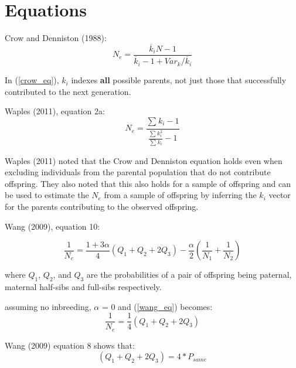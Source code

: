 \documentclass{article}
\begin{document}
\section*{Equations}
\begin{description}

\item Crow and Denniston (1988):
\begin{equation} \label{crow_eq}
N_e = \dfrac{\overline{k}_i N - 1}{\overline{k}_i-1+ Var_k/\overline{k}_i} 
\end{equation}

In (\ref{crow_eq}), $k_i$ indexes \textbf{all} possible parents, not just those that successfully contributed to the next generation.

\item Waples (2011), equation 2a:
\begin{equation} \label{waples_eq}
 N_e = \frac{\sum_{}^{} k_i - 1}{\frac{\sum_{}^{} k_i^2}{\sum_{}^{} k_i} -1 } 
\end{equation}

Waples (2011) noted that the Crow and Denniston equation holds even when excluding individuals from the parental population that do not contribute offspring.  They also noted that this also holds for a sample of offspring and can be used to estimate the $N_e$ from a sample of offspring by inferring the $k_i$ vector for the parents contributing to the observed offspring. 

\item Wang (2009), equation 10:

\begin{equation} \label{wang_eq}
\frac{1}{N_e} = \frac{1+3\alpha}{4}(Q_1+Q_2+2Q_3)-\frac{\alpha}{2}(\frac{1}{N_1}+\frac{1}{N_2})
\end{equation}

where $Q_1$, $Q_2$, and $Q_3$ are the probabilities of a pair of offspring being paternal, maternal half-sibs and full-sibs respectively.

assuming no inbreeding, $\alpha$ = 0 and (\ref{wang_eq}) becomes:
\begin{equation} \label{wang_noalpha}
\frac{1}{N_e} = \frac{1}{4}(Q_1+Q_2+2Q_3)
\end{equation}

Wang (2009) equation 8 shows that: 
\begin{equation}
(Q_1+Q_2+2Q_3) = 4*P_{same}
\end{equation}



\end{description}
\end{document}
